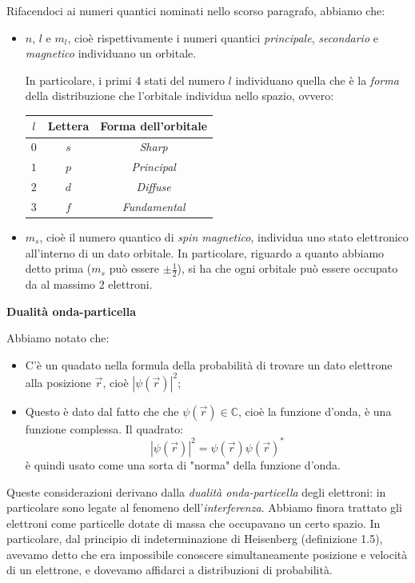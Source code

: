 \documentclass[a4paper,11pt]{article}
\begin{document}
Rifacendoci ai numeri quantici nominati nello scorso paragrafo, abbiamo che:
\begin{itemize}
	\item $n$, $l$ e $m_l$, cioè rispettivamente i numeri quantici \textit{principale}, \textit{secondario} e \textit{magnetico} individuano un orbitale. 

		In particolare, i primi 4 stati del numero $l$ individuano quella che è la \textit{forma} della distribuzione che l'orbitale individua nello spazio, ovvero:
		\begin{table}[h!]
			\center {}
			\begin{tabular} { c | c | c }
				\bfseries $l$ & \bfseries Lettera & \bfseries Forma dell'orbitale \\
				\hline 
				$0$ & $s$ & \textit{Sharp} \\
				$1$ & $p$ & \textit{Principal} \\
				$2$ & $d$ & \textit{Diffuse} \\
				$3$ & $f$ & \textit{Fundamental} \\
			\end{tabular}
		\end{table}
	\item $m_s$, cioè il numero quantico di \textit{spin magnetico}, individua uno stato elettronico all'interno di un dato orbitale. In particolare, riguardo a quanto abbiamo detto prima ($m_s$ può essere $\pm \frac{1}{2}$), si ha che ogni orbitale può essere occupato da al massimo 2 elettroni.
\end{itemize}

\par\smallskip

\noindent
\textbf{\textsf{Dualità onda-particella}}

\noindent
Abbiamo notato che:
\begin{itemize}
	\item 
C'è un quadato nella formula della probabilità di trovare un dato elettrone alla posizione $\vec{r}$, cioè $|\psi(\vec{r})|^2$;
	\item Questo è dato dal fatto che che $\psi(\vec{r}) \in \mathbb{C}$, cioè la funzione d'onda, è una funzione complessa. Il quadrato:
		$$
		|\psi(\vec{r})|^2 = \psi(\vec{r}) \psi(\vec{r})^*
		$$
		è quindi usato come una sorta di "norma" della funzione d'onda.
\end{itemize}

Queste considerazioni derivano dalla \textit{dualità onda-particella} degli elettroni: in particolare sono legate al fenomeno dell'\textit{interferenza}.
Abbiamo finora trattato gli elettroni come particelle dotate di massa che occupavano un certo spazio. In particolare, dal principio di indeterminazione di Heisenberg (definizione 1.5), avevamo detto che era impossibile conoscere simultaneamente posizione e velocità di un elettrone, e dovevamo affidarci a distribuzioni di probabilità.
\end{document}
